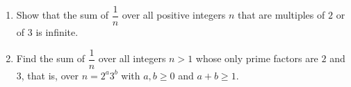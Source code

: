 \begin{enumerate}
\item[(a)] Show that the sum of $\dfrac1n$ over all positive integers $n$ that are multiples of $2$ or of $3$ is infinite.
\item[(b)] Find the sum of $\dfrac1n$ over all integers $n>1$ whose only prime factors are $2$ and $3$, that is, over $n=2^a3^b$ with $a,b\ge0$ and $a+b\ge1$.
\end{enumerate}

